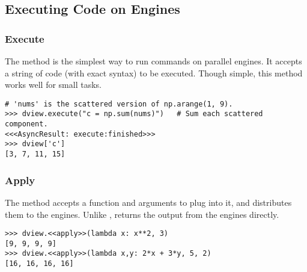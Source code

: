 \subsection*{Executing Code on Engines} %


\subsubsection*{Execute} %

The  method is the simplest way to run commands on parallel engines.
It accepts a string of code (with exact syntax) to be executed.
Though simple, this method works well for small tasks.

\begin{lstlisting}
# 'nums' is the scattered version of np.arange(1, 9).
>>> dview.execute("c = np.sum(nums)")   # Sum each scattered component.
<<<AsyncResult: execute:finished>>>
>>> dview['c']
[3, 7, 11, 15]
\end{lstlisting}

\subsubsection*{Apply} %

The  method accepts a function and arguments to plug into it, and distributes them to the engines.
Unlike ,  returns the output from the engines directly.

\begin{lstlisting}
>>> dview.<<apply>>(lambda x: x**2, 3)
[9, 9, 9, 9]
>>> dview.<<apply>>(lambda x,y: 2*x + 3*y, 5, 2)
[16, 16, 16, 16]
\end{lstlisting}

